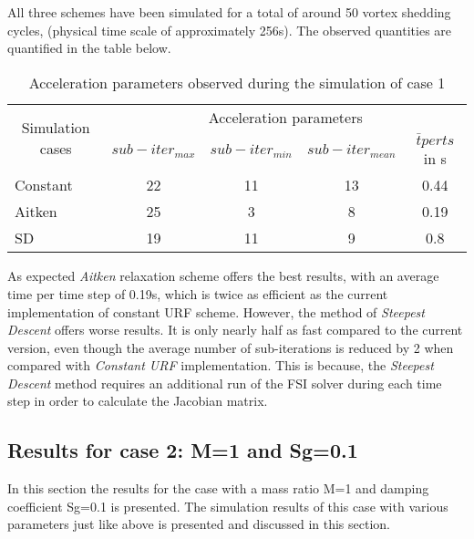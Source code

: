 All three schemes have been simulated for a total of around 50 vortex shedding cycles, (physical time scale of approximately 256s). The observed quantities are quantified in the table below.

\begin{table}[htbp]
  \centering
   \begin{tabular}{|l|c|c|c|c|}
    \hline
    \multicolumn{1}{|c|}{\multirow{2}[4]{*}{Simulation cases}} & \multicolumn{4}{c|}{Acceleration parameters} \\
\cline{2-5}          & ${sub-iter}_{max}$ & ${sub-iter}_{min}$ & ${sub-iter}_{mean}$ & ${\bar{t}} per ts$ in s \\
    \hline
    Constant & 22    & 11    & 13    & 0.44 \\
    \hline
    Aitken & 25    & 3     & 8     & 0.19 \\
    \hline
    SD    & 19    & 11    & 9     & 0.8 \\
    \hline
    \end{tabular}%
   \caption{Acceleration parameters observed during the simulation of case 1}
  \label{table:4.8}%
\end{table}%

As expected \textit{Aitken} relaxation scheme offers the best results, with an average time per time step of 0.19s, which is twice as efficient as the current implementation of constant URF scheme. However, the method of \textit{Steepest Descent} offers worse results. It is only nearly half as fast compared to the current version, even though the average number of sub-iterations is reduced by 2 when compared with \textit{Constant URF} implementation. This is because, the \textit{Steepest Descent} method requires an additional run of the FSI solver during each time step in order to calculate the Jacobian matrix. 

\subsection{Results for case 2: M=1 and Sg=0.1}
In this section the results for the case with a mass ratio M=1 and damping coefficient Sg=0.1 is presented. The simulation results of this case with various parameters just like above is presented and discussed in this section. 

